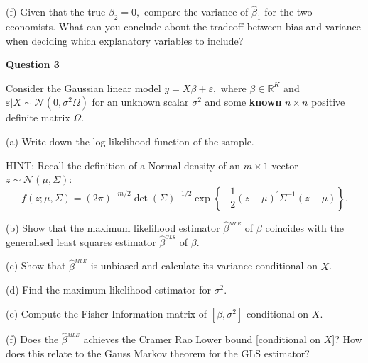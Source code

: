 \documentclass{article}
\begin{document}
(f) Given that the true $\beta _{2}=0,$ compare the variance of $\hat{\beta}%
_{1}$ for the two economists. What can you conclude about the tradeoff
between bias and variance when deciding which explanatory variables to
include?

\bigskip 

\textbf{Question 3 }

Consider the Gaussian linear model $y=X\beta +\varepsilon ,$ where $\beta
\in \mathbb{R}^{K}$ and $\varepsilon |X\sim \mathcal{N}\left( 0,\sigma
^{2}\Omega \right) $ for an unknown scalar $\sigma ^{2}$ and some \textbf{%
known} $n\times n$ positive definite matrix $\Omega $.

(a) Write down the log-likelihood function of the sample. 

HINT: Recall the definition of a Normal density of an $m\times 1$ vector $%
z\sim \mathcal{N}\left( \mu ,\Sigma \right) $: $\ $%
\begin{equation*}
f\left( z;\mu ,\Sigma \right) =\left( 2\pi \right) ^{-m/2}\det \left( \Sigma
\right) ^{-1/2}\exp \left\{ -\frac{1}{2}\left( z-\mu \right) ^{\prime
}\Sigma ^{-1}\left( z-\mu \right) \right\} .
\end{equation*}

(b) Show that the maximum likelihood estimator $\hat{\beta}^{_{MLE}}$ of $%
\beta $ coincides with the generalised least squares estimator $\hat{\beta}%
^{_{GLS}}$ of $\beta $.

(c) Show that $\hat{\beta}^{_{MLE}}$ is unbiased and calculate its variance
conditional on $X$.

(d) Find the maximum likelihood estimator for $\sigma ^{2}$.

(e) Compute the Fisher Information matrix of $[\beta ,\sigma ^{2}]$
conditional on $X$.

(f) Does the $\hat{\beta}^{_{MLE}}$ achieves the Cramer Rao Lower bound
[conditional on $X$]? How does this relate to the Gauss Markov theorem for
the GLS estimator?
\end{document}
